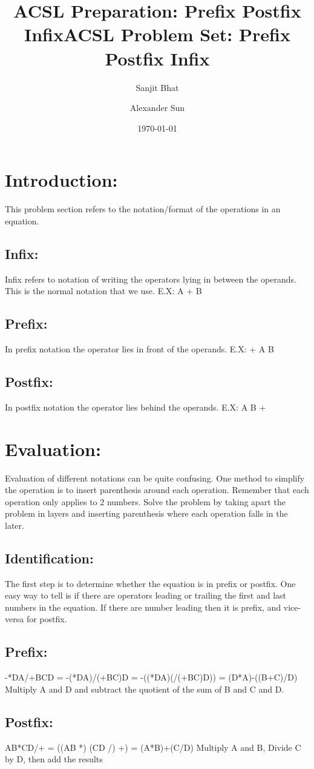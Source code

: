 \documentclass{article}
\title{ACSL Preparation: Prefix Postfix Infix}
\author{Sanjit Bhat \and Alexander Sun}
\date{\today}
\begin{document}
\maketitle

\newpage

\begin{center}
    \title{ACSL Problem Set: Prefix Postfix Infix}
\end{center}

\section{Introduction:}
This problem section refers to the notation/format of the operations in an equation. 

\subsection{Infix:}
Infix refers to notation of writing the operators lying in between the operands. This is the normal notation that we use. E.X: A + B

\subsection{Prefix:}
In prefix notation the operator lies in front of the operands. E.X: + A B

\subsection{Postfix:}
In postfix notation the operator lies behind the operands. E.X: A B +

\section{Evaluation:}
Evaluation of different notations can be quite confusing. One method to simplify the operation is to insert parenthesis around each operation. Remember that each operation only applies to 2 numbers. Solve the problem by taking apart the problem in layers and inserting parenthesis where each operation falls in the later. 

\subsection{Identification:}
The first step is to determine whether the equation is in prefix or postfix. One easy way to tell is if there are operators leading or trailing the first and last numbers in the equation. If there are number leading then it is prefix, and vice-versa for postfix.

\subsection{Prefix:}
-*DA/+BCD = -(*DA)/(+BC)D = -((*DA)(/(+BC)D)) = (D*A)-((B+C)/D) Multiply A and D and subtract the quotient of the sum of B and C and D.

\subsection{Postfix:}
AB*CD/+ = ((AB *) (CD /) +) = (A*B)+(C/D)
Multiply A and B, Divide C by D, then add the results







\enddocument
\end{document}
